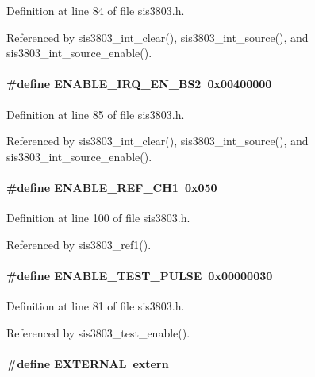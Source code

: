 Definition at line 84 of file sis3803.h.

Referenced by sis3803\_\-int\_\-clear(), sis3803\_\-int\_\-source(), and sis3803\_\-int\_\-source\_\-enable().
\paragraph[{ENABLE\_\-IRQ\_\-EN\_\-BS2}]{\setlength{\rightskip}{0pt plus 5cm}\#define ENABLE\_\-IRQ\_\-EN\_\-BS2~0x00400000}\hfill\label{sis3803_8h_a92fdd9ffe4e5b0edd07d2a510328e7c3}


Definition at line 85 of file sis3803.h.

Referenced by sis3803\_\-int\_\-clear(), sis3803\_\-int\_\-source(), and sis3803\_\-int\_\-source\_\-enable().
\paragraph[{ENABLE\_\-REF\_\-CH1}]{\setlength{\rightskip}{0pt plus 5cm}\#define ENABLE\_\-REF\_\-CH1~0x050}\hfill\label{sis3803_8h_ac06f88428745dae692305b1b303f883b}


Definition at line 100 of file sis3803.h.

Referenced by sis3803\_\-ref1().
\paragraph[{ENABLE\_\-TEST\_\-PULSE}]{\setlength{\rightskip}{0pt plus 5cm}\#define ENABLE\_\-TEST\_\-PULSE~0x00000030}\hfill\label{sis3803_8h_a1c98cd2ea3db1947686647bc17aca4a2}


Definition at line 81 of file sis3803.h.

Referenced by sis3803\_\-test\_\-enable().
\paragraph[{EXTERNAL}]{\setlength{\rightskip}{0pt plus 5cm}\#define EXTERNAL~extern}\hfill\label{sis3803_8h_af3fe37c1cda80aa7202b5a3bb7557dc9}


